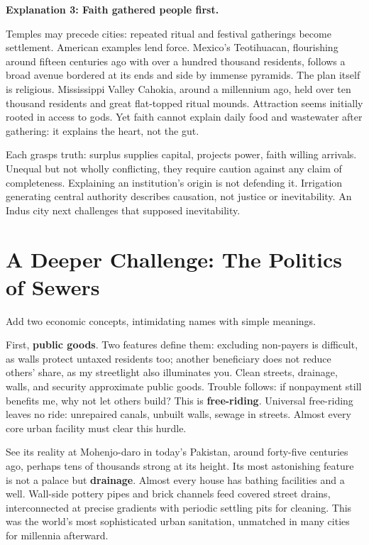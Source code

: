 \textbf{Explanation 3: Faith gathered people first.}

Temples may precede cities: repeated ritual and festival gatherings become settlement. American examples lend force. Mexico's Teotihuacan, flourishing around fifteen centuries ago with over a hundred thousand residents, follows a broad avenue bordered at its ends and side by immense pyramids. The plan itself is religious. Mississippi Valley Cahokia, around a millennium ago, held over ten thousand residents and great flat-topped ritual mounds. Attraction seems initially rooted in access to gods. Yet faith cannot explain daily food and wastewater after gathering: it explains the heart, not the gut.

Each grasps truth: surplus supplies capital, projects power, faith willing arrivals. Unequal but not wholly conflicting, they require caution against any claim of completeness. Explaining an institution's origin is not defending it. Irrigation generating central authority describes causation, not justice or inevitability. An Indus city next challenges that supposed inevitability.

\section[Further Challenge: Sewer Politics]{A Deeper Challenge: The Politics of Sewers}
Add two economic concepts, intimidating names with simple meanings.

First, \textbf{public goods}. Two features define them: excluding non-payers is difficult, as walls protect untaxed residents too; another beneficiary does not reduce others' share, as my streetlight also illuminates you. Clean streets, drainage, walls, and security approximate public goods. Trouble follows: if nonpayment still benefits me, why not let others build? This is \textbf{free-riding}. Universal free-riding leaves no ride: unrepaired canals, unbuilt walls, sewage in streets. Almost every core urban facility must clear this hurdle.

See its reality at Mohenjo-daro in today's Pakistan, around forty-five centuries ago, perhaps tens of thousands strong at its height. Its most astonishing feature is not a palace but \textbf{drainage}. Almost every house has bathing facilities and a well. Wall-side pottery pipes and brick channels feed covered street drains, interconnected at precise gradients with periodic settling pits for cleaning. This was the world's most sophisticated urban sanitation, unmatched in many cities for millennia afterward.

